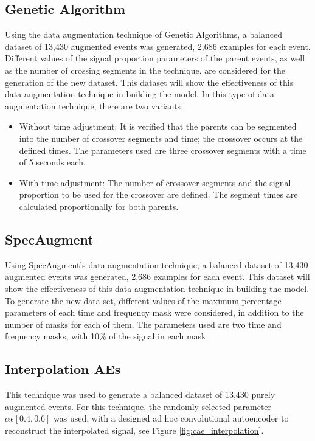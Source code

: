 \documentclass[journal]{IEEEtran}
\begin{document}
\subsection{Genetic Algorithm}
Using the data augmentation technique of Genetic Algorithms, a balanced dataset of 13,430 augmented events was generated, 2,686 examples for each event. Different values of the signal proportion parameters of the parent events, as well as the number of crossing segments in the technique, are considered for the generation of the new dataset. This dataset will show the effectiveness of this data augmentation technique in building the model.
In this type of data augmentation technique, there are two variants:
\begin{itemize}
 \item Without time adjustment: It is verified that the parents can be segmented into the number of crossover segments and time; the crossover occurs at the defined times. The parameters used are three crossover segments with a time of 5 seconds each.
 \item With time adjustment: The number of crossover segments and the signal proportion to be used for the crossover are defined. The segment times are calculated proportionally for both parents.
\end{itemize}
\subsection{SpecAugment}
Using SpecAugment's data augmentation technique, a balanced dataset of 13,430 augmented events was generated, 2,686 examples for each event. This dataset will show the effectiveness of this data augmentation technique in building the model. To generate the new data set, different values of the maximum percentage parameters of each time and frequency mask were considered, in addition to the number of masks for each of them.
The parameters used are two time and frequency masks, with 10\% of the signal in each mask.

\subsection{Interpolation AEs}
This technique was used to generate a balanced dataset of 13,430 purely augmented events.
For this technique, the randomly selected parameter $\alpha\epsilon\left[0.4,0.6\right]$ was used, with a designed ad hoc convolutional autoencoder to reconstruct the interpolated signal, see Figure \ref{fig:cae_interpolation}.
\end{document}
